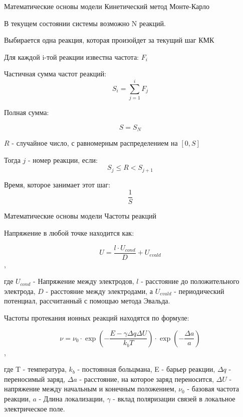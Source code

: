 \documentclass{beamer}%
\begin{document}


\begin{frame}{Математические основы модели} {Кинетический метод Монте-Карло}

\small

В текущем состоянии системы возможно N реакций.

Выбирается одна реакция, которая произойдет за текущий шаг КМК

Для каждой i-той реакции известна частота: 
\(F_i\)

Частичная сумма частот реакций:
\[S_i = \sum_{j=1}^{i}{F_j}\]

Полная сумма:

\[S = S_N\]

$R$ - случайное число, с равномерным распределением на $[0,S]$

Тогда $j$ - номер реакции, если:
\[S_j \le R < S_{j+1}\]

Время, которое занимает этот шаг:
 \[\frac{1}{S}\]

\end{frame}


\begin{frame}{Математические основы модели} {Частоты реакций}

    \small

    Напряжение в любой точке находится как:

    \[U = \frac{l\cdot U_{cond}}{D}+U_{evald}\],

    где \(U_{cond}\) - Напряжение между электродов, \(l\) - расстояние до положительного электрода, \(D\) - расстояние между электродами, а \(U_{evald}\) - периодический потенциал, рассчитанный с помощью метода Эвальда.

    Частоты протекания ионных реакций находятся по формуле:

    \[\nu = \nu _0 \cdot
    \exp{(-\frac{E-\gamma \Delta q \Delta U}{k_bT})} \cdot
    \exp{(-\frac{\Delta a}{a})}
    \],

    где T - температура,
    \(k_b\) - постоянная больцмана,
    E - барьер реакции,
    \(\Delta q\) - переносимый заряд,
    \(\Delta a\) - расстояние, на которое заряд переносится,
    \(\Delta U\) - напряжение между начальным и конечным положением,
    \(\nu_0\)  - базовая частота реакции,
    \(a\) - Длина локализации,
    \(\gamma\) - вклад поляризации связей в локальное электрическое поле.
    

    
\end{frame}
\end{document}
